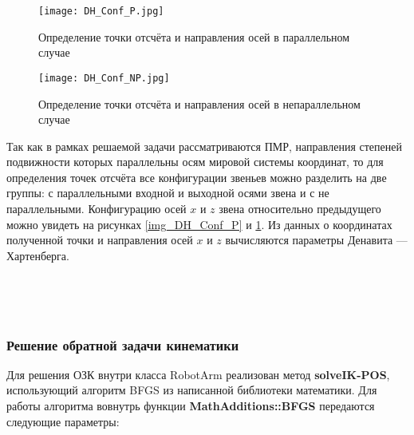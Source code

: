 \begin{figure}[!tbp]
  \centering
  \begin{gostfigure}
  \begin{minipage}[b]{0.4\textwidth}
    \texttt{[image: DH\_Conf\_P.jpg]}
    \caption{Определение точки отсчёта и направления осей в параллельном случае}
    \label{img_DH_Conf_P}
  \end{minipage}
  \end{gostfigure}
  \hfill
  \begin{gostfigure}
  \begin{minipage}[b]{0.4\textwidth}
    \texttt{[image: DH\_Conf\_NP.jpg]}
    \caption{Определение точки отсчёта и направления осей в непараллельном случае}
    \label{img_DH_Conf_NP}
  \end{minipage}
  \end{gostfigure}
  
\end{figure}


Так как в рамках решаемой задачи рассматриваются ПМР, направления степеней подвижности которых параллельны осям мировой системы координат, то для определения точек отсчёта все конфигурации звеньев можно разделить на две группы: с параллельными входной и выходной осями звена и с не параллельными. Конфигурацию осей $x$ и $z$ звена относительно предыдущего можно увидеть на рисунках \ref{img_DH_Conf_P} и \ref{img_DH_Conf_NP}. Из данных о координатах полученной точки и направления осей $x$ и $z$ вычисляются параметры Денавита — Хартенберга.

~

~

\subsubsection{\textbf{Решение обратной задачи кинематики}}

Для решения ОЗК внутри класса RobotArm реализован метод \textbf{solveIK-POS}, использующий алгоритм BFGS из написанной библиотеки математики. Для работы алгоритма вовнутрь функции \textbf{MathAdditions::BFGS} передаются следующие параметры:

